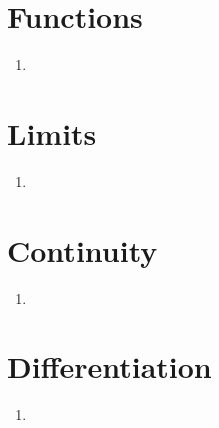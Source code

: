 \documentclass[17pt]{extarticle}
\begin{document}
\begin{multicols}{2}
\begin{enumerate}
\end{enumerate} 

\section{Functions}
\noindent
\begin{enumerate}
\item

\end{enumerate} 

\section{Limits}
\noindent
\begin{enumerate}
\item 

\end{enumerate} 

\section{Continuity}
\noindent
\begin{enumerate}
\item

\end{enumerate} 

\section{Differentiation}
\noindent
\begin{enumerate}
\item 

\end{enumerate} 


\end{multicols}
 
\end{document}
